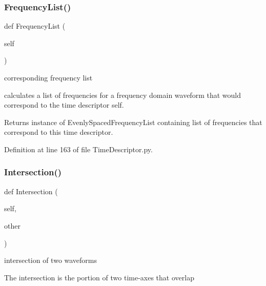 \subsubsection{\texorpdfstring{Frequency\+List()}{FrequencyList()}}
{\footnotesize\ttfamily def Frequency\+List (\begin{DoxyParamCaption}\item[{}]{self }\end{DoxyParamCaption})}



corresponding frequency list 

calculates a list of frequencies for a frequency domain waveform that would correspond to the time descriptor self.

\begin{DoxyReturn}{Returns}
instance of Evenly\+Spaced\+Frequency\+List containing list of frequencies that correspond to this time descriptor. 
\end{DoxyReturn}


Definition at line 163 of file Time\+Descriptor.\+py.

\mbox{\label{classSignalIntegrity_1_1TimeDomain_1_1Waveform_1_1TimeDescriptor_1_1TimeDescriptor_a4035abdb0ca1b8258580a359f573e55a}} 
\subsubsection{\texorpdfstring{Intersection()}{Intersection()}}
{\footnotesize\ttfamily def Intersection (\begin{DoxyParamCaption}\item[{}]{self,  }\item[{}]{other }\end{DoxyParamCaption})}



intersection of two waveforms 

The intersection is the portion of two time-\/axes that overlap


